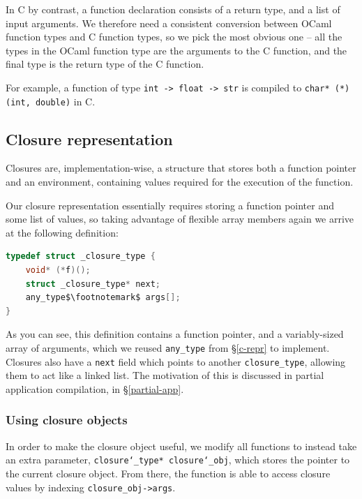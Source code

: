 \documentclass[12pt,a4paper,twoside,openright]{report}
\begin{document}
In C by contrast, a function declaration consists of a return type, and a list 
of input arguments. We therefore need a consistent conversion between OCaml 
function types and C function types, so we pick the most obvious one -- all the 
types in the OCaml function type are the arguments to the C function, and the 
final type is the return type of the C function.

For example, a function of type \texttt{int -> float -> str} is compiled to
\texttt{char* (*)(int, double)} in C.

\subsection{Closure representation}

Closures are, implementation-wise, a structure that stores both a function 
pointer and an environment, containing values required for the execution of the 
function.

Our closure representation essentially requires storing a function pointer and 
some list of values, so taking advantage of flexible array members again we 
arrive at the following definition:

\begin{lstlisting}[language=C]
typedef struct _closure_type {
    void* (*f)();
    struct _closure_type* next;
    any_type$\footnotemark$ args[];
}
\end{lstlisting}


As you can see, this definition contains a function pointer, and a
variably-sized array of arguments, which we reused \verb|any_type| from
\S\ref{c-repr} to implement. Closures also have a \texttt{next} field which
points to another \verb|closure_type|, allowing them to act like a linked list.
The motivation of this is discussed in partial application compilation, in
\S\ref{partial-app}.

\subsubsection{Using closure objects}

In order to make the closure object useful, we modify all functions to instead
take an extra parameter, \texttt{closure\char`_type* closure\char`_obj}, which
stores the pointer to the current closure object. From there, the function is
able to access closure values by indexing \verb|closure_obj->args|.
\end{document}
